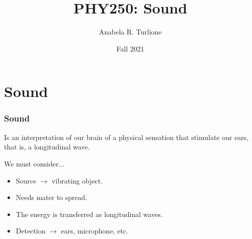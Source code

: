 \documentclass[]{beamer}
\title{PHY250: Sound}    %
\author{Anabela R. Turlione}                 %
\institute{Digipen}      %
\date{Fall 2021}                    %
\begin{document}
\begin{frame}
  \titlepage
\end{frame}

\section[]{}

\begin{frame}
  \tableofcontents
\end{frame}






\section{Sound}

\begin{frame}
\frametitle{Sound}

Is an interpretation of our brain of a physical sensation that stimulate our ears, that is, a longitudinal wave.

\pause

\vspace{3mm}

We must consider...

\pause
\begin{itemize}
\item Source $\rightarrow$ vibrating object.

\pause
\item Needs mater to spread.

\pause
\item The energy is transferred as longitudinal waves.

\pause
\item Detection $\rightarrow$ ears, microphone, etc.
\end{itemize}


  \end{frame}
\end{document}

